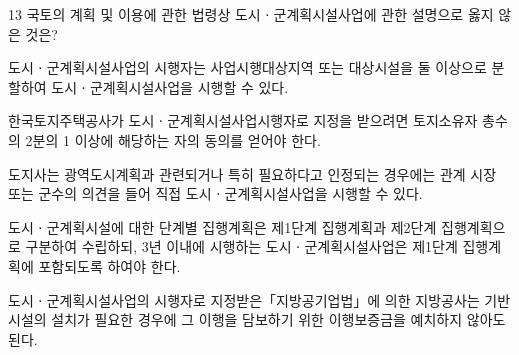 \begin{question}{13}
국토의 계획 및 이용에 관한 법령상 도시ㆍ군계획시설사업에 관한 설명으로 옳지 않은 것은?
\begin{choices}
  \item 도시ㆍ군계획시설사업의 시행자는 사업시행대상지역 또는 대상시설을 둘 이상으로 분할하여 도시ㆍ군계획시설사업을 시행할 수 있다.
  \item 한국토지주택공사가 도시ㆍ군계획시설사업시행자로 지정을 받으려면 토지소유자 총수의 2분의 1 이상에 해당하는 자의 동의를 얻어야 한다.
  \item 도지사는 광역도시계획과 관련되거나 특히 필요하다고 인정되는 경우에는 관계 시장 또는 군수의 의견을 들어 직접 도시ㆍ군계획시설사업을 시행할 수 있다.
  \item 도시ㆍ군계획시설에 대한 단계별 집행계획은 제1단계 집행계획과 제2단계 집행계획으로 구분하여 수립하되, 3년 이내에 시행하는 도시ㆍ군계획시설사업은 제1단계 집행계획에 포함되도록 하여야 한다.
  \item 도시ㆍ군계획시설사업의 시행자로 지정받은「지방공기업법」에 의한 지방공사는 기반시설의 설치가 필요한 경우에 그 이행을 담보하기 위한 이행보증금을 예치하지 않아도 된다.
\end{choices}
\end{question}
